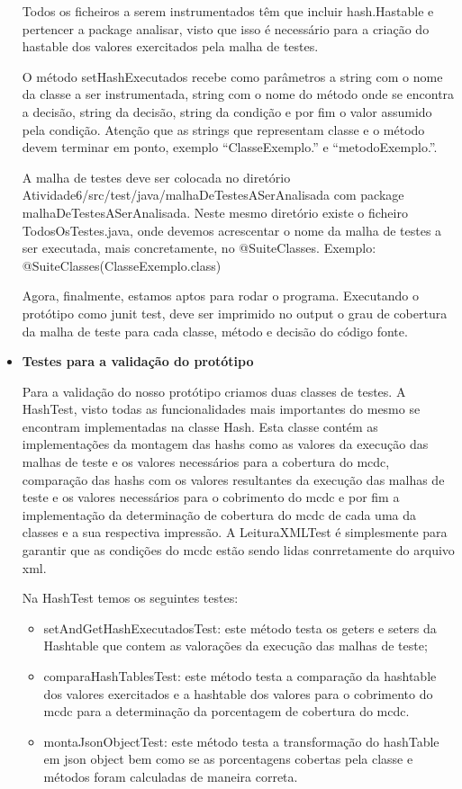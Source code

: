 \documentclass[a4paper,11pt]{article}
\newcommand{\sepitem}{\vspace{0.1in}\item}
\begin{document}
\begin{itemize}
Todos os ficheiros a serem instrumentados têm que incluir hash.Hastable e pertencer a package analisar, 
visto que isso é necessário para a criação do hastable dos valores exercitados pela malha de testes.

O método setHashExecutados recebe como parâmetros a string com o nome da classe a ser instrumentada, 
string com o nome do método onde se encontra a decisão, string da decisão, string da condição e por fim 
o valor assumido pela condição. Atenção que as strings que representam classe e o método devem terminar 
em ponto, exemplo ``ClasseExemplo.'' e ``metodoExemplo.''.

A malha de testes deve ser colocada no diretório Atividade6/src/test/java/malhaDeTestesASerAnalisada com 
package malhaDeTestesASerAnalisada. Neste mesmo diretório existe o ficheiro TodosOsTestes.java, onde devemos
acrescentar o nome da malha de testes a ser executada, mais concretamente, no @SuiteClasses. Exemplo: 
@SuiteClasses({ClasseExemplo.class})

Agora, finalmente, estamos aptos para rodar o programa. Executando o protótipo como junit test, deve ser imprimido 
no output o grau de cobertura da malha de teste para cada classe, método e decisão do código fonte.   

\sepitem \textbf{Testes para a validação do protótipo}
\setlength{\parindent}{5ex}

Para a validação do nosso protótipo criamos duas classes de testes. A HashTest, visto todas as funcionalidades 
mais importantes do mesmo se encontram implementadas na classe Hash. Esta classe contém as implementações da 
montagem das hashs como as valores da execução das malhas de teste e os valores necessários para a cobertura do
mcdc, comparação das hashs com os valores resultantes da execução das malhas de teste e os valores necessários 
para o cobrimento do mcdc e por fim a implementação da determinação de cobertura do mcdc de cada uma da classes
e a sua respectiva impressão. A LeituraXMLTest é simplesmente para garantir que as condições do mcdc estão sendo
lidas conrretamente do arquivo xml.

Na HashTest temos os seguintes testes:
\begin{itemize}
\item setAndGetHashExecutadosTest: este método testa os geters e seters da Hashtable que contem as valorações da 
execução das malhas de teste;
\item comparaHashTablesTest: este método testa a comparação da hashtable dos valores exercitados e a hashtable dos
valores para o cobrimento do mcdc para a determinação da porcentagem de cobertura do mcdc. 
\item montaJsonObjectTest: este método testa a transformação do hashTable em json object bem como se as porcentagens cobertas pela classe e métodos foram calculadas de maneira correta. 
\end{itemize}


\end{itemize}
\end{document}
